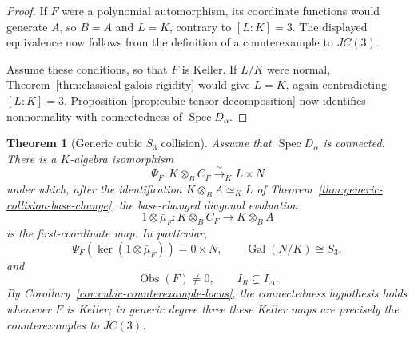 \documentclass[11pt]{article}
\newtheorem{theorem}{Theorem}[section]
\theoremstyle{remark}
\DeclareMathOperator{\Spec}{Spec}
\DeclareMathOperator{\Gal}{Gal}
\newcommand{\Obs}{\operatorname{Obs}}
\begin{document}
\begin{proof}
If \(F\) were a polynomial automorphism, its coordinate functions would
generate \(A\), so \(B=A\) and \(L=K\), contrary to \([L:K]=3\).
The displayed equivalence now follows from the definition of a
counterexample to \(JC(3)\).

Assume these conditions, so that \(F\) is Keller.  If \(L/K\) were
normal, Theorem~\ref{thm:classical-galois-rigidity} would give \(L=K\),
again contradicting \([L:K]=3\).  Proposition
\ref{prop:cubic-tensor-decomposition} now identifies nonnormality with
connectedness of \(\Spec D_\alpha\).
\end{proof}

\begin{theorem}[Generic cubic \(S_3\) collision]
\label{thm:cubic-s3-collision}
Assume that \(\Spec D_\alpha\) is connected.  There is a \(K\)-algebra
isomorphism
\[
  \Psi_F\colon K\otimes_BC_F\xrightarrow{\sim}_K L\times N
\]
under which, after the identification \(K\otimes_BA\simeq_K L\) of
Theorem~\ref{thm:generic-collision-base-change}, the base-changed diagonal
evaluation
\[
  1\otimes\bar\mu_F
  \colon K\otimes_BC_F\longrightarrow K\otimes_BA
\]
is the first-coordinate map.  In particular,
\[
  \Psi_F\!\left(
    \ker(1\otimes\bar\mu_F)
  \right)
  =0\times N,
  \qquad
  \Gal(N/K)\cong S_3,
\]
and
\[
  \Obs(F)\neq0,
  \qquad
  I_R\subsetneq I_\Delta.
\]
By Corollary~\ref{cor:cubic-counterexample-locus}, the connectedness
hypothesis holds whenever \(F\) is Keller; in generic degree three these
Keller maps are precisely the counterexamples to \(JC(3)\).
\end{theorem}
\end{document}

